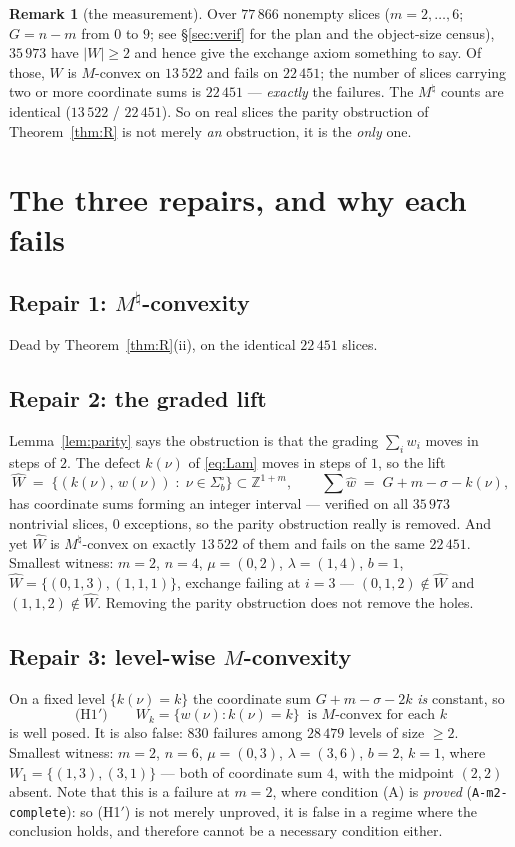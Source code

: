 \documentclass[11pt]{article}
\theoremstyle{plain}
\theoremstyle{definition}
\newtheorem{remark}[theorem]{Remark}
\newcommand{\Z}{\mathbb{Z}}
\begin{document}
\begin{remark}[the measurement]\label{rem:measure}
Over $77\,866$ nonempty slices ($m=2,\dots,6$; $G=n-m$ from $0$ to $9$; see
\S\ref{sec:verif} for the plan and the object-size census), $35\,973$ have $|W|\ge2$ and
hence give the exchange axiom something to say. Of those, $W$ is $M$-convex on $13\,522$
and fails on $22\,451$; the number of slices carrying two or more coordinate sums is
$22\,451$ --- \emph{exactly} the failures. The $M^\natural$ counts are identical
($13\,522$ / $22\,451$). So on real slices the parity obstruction of
Theorem~\ref{thm:R} is not merely \emph{an} obstruction, it is the \emph{only} one.
\end{remark}

\section{The three repairs, and why each fails}\label{sec:repairs}

\subsection*{Repair 1: $M^\natural$-convexity}
Dead by Theorem~\ref{thm:R}(ii), on the identical $22\,451$ slices.

\subsection*{Repair 2: the graded lift}
Lemma~\ref{lem:parity} says the obstruction is that the grading $\sum_i w_i$ moves in
steps of $2$. The defect $k(\nu)$ of \eqref{eq:Lam} moves in steps of $1$, so the lift
\[
  \widehat W \;=\;\bigl\{(k(\nu),\,w(\nu))\;:\;\nu\in\Sigma_b^\circ\bigr\}\subset\Z^{1+m},
  \qquad
  \textstyle\sum\widehat w \;=\; G+m-\sigma-k(\nu),
\]
has coordinate sums forming an integer interval --- verified on all $35\,973$ nontrivial
slices, $0$ exceptions, so the parity obstruction really is removed. And yet
$\widehat W$ is $M^\natural$-convex on exactly $13\,522$ of them and fails on the same
$22\,451$. Smallest witness: $m=2$, $n=4$, $\mu=(0,2)$, $\lambda=(1,4)$, $b=1$,
$\widehat W=\{(0,1,3),(1,1,1)\}$, exchange failing at $i=3$ --- $(0,1,2)\notin\widehat W$
and $(1,1,2)\notin\widehat W$. Removing the parity obstruction does not remove the holes.

\subsection*{Repair 3: level-wise $M$-convexity}
On a fixed level $\{k(\nu)=k\}$ the coordinate sum $G+m-\sigma-2k$ \emph{is} constant, so
\[
  \text{(H1$'$)}\qquad W_k=\{w(\nu):k(\nu)=k\}\ \text{ is } M\text{-convex for each }k
\]
is well posed. It is also false: $830$ failures among $28\,479$ levels of size $\ge2$.
Smallest witness: $m=2$, $n=6$, $\mu=(0,3)$, $\lambda=(3,6)$, $b=2$, $k=1$, where
$W_1=\{(1,3),(3,1)\}$ --- both of coordinate sum $4$, with the midpoint $(2,2)$ absent.
Note that this is a failure at $m=2$, where condition (A) is \emph{proved}
(\texttt{A-m2-complete}): so (H1$'$) is not merely unproved, it is false in a regime where
the conclusion holds, and therefore cannot be a necessary condition either.
\end{document}
